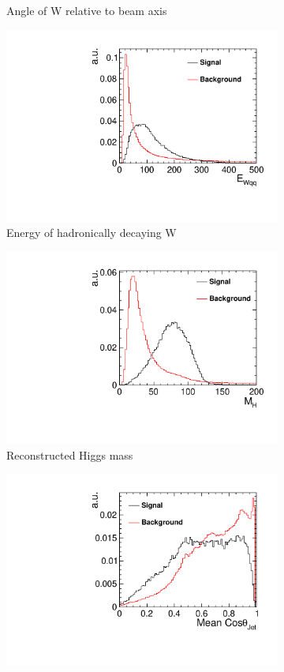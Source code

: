 \begin{figure}[h]
\begin{subfigure}[]{0.5\linewidth}
    \caption{Angle of W relative to beam axis} 
    \vspace{4ex}
  \end{subfigure}
    \begin{subfigure}[]{0.5\linewidth}
    \centering
    \includegraphics[width=0.75\linewidth]{Appendix/figures/EWqq} 
    \caption{Energy of hadronically decaying W} 
    \vspace{4ex}
  \end{subfigure}%
  \begin{subfigure}[]{0.5\linewidth}
    \centering
    \includegraphics[width=0.75\linewidth]{Appendix/figures/HiggsMass} 
    \caption{Reconstructed Higgs mass} 
    \vspace{4ex}
  \end{subfigure}
    \begin{subfigure}[]{0.5\linewidth}
    \centering
    \includegraphics[width=0.75\linewidth]{Appendix/figures/JetCosTheta} 

\end{subfigure}
\end{figure}
